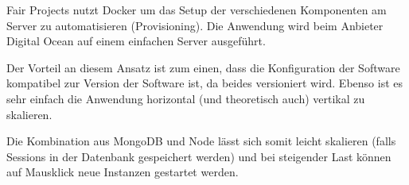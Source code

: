 Fair Projects nutzt Docker um das Setup der verschiedenen Komponenten am
Server zu automatisieren (Provisioning). Die Anwendung wird beim
Anbieter Digital Ocean auf einem einfachen Server ausgeführt.

Der Vorteil an diesem Ansatz ist zum einen, dass die Konfiguration der
Software kompatibel zur Version der Software ist, da beides versioniert
wird. Ebenso ist es sehr einfach die Anwendung horizontal (und
theoretisch auch) vertikal zu skalieren.

Die Kombination aus MongoDB und Node lässt sich somit leicht skalieren
(falls Sessions in der Datenbank gespeichert werden) und bei steigender
Last können auf Mausklick neue Instanzen gestartet werden.

